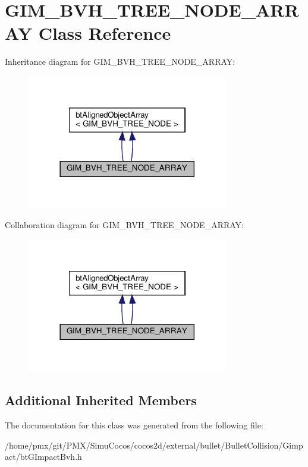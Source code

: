 \hypertarget{classGIM__BVH__TREE__NODE__ARRAY}{}\section{G\+I\+M\+\_\+\+B\+V\+H\+\_\+\+T\+R\+E\+E\+\_\+\+N\+O\+D\+E\+\_\+\+A\+R\+R\+AY Class Reference}
\label{classGIM__BVH__TREE__NODE__ARRAY}


Inheritance diagram for G\+I\+M\+\_\+\+B\+V\+H\+\_\+\+T\+R\+E\+E\+\_\+\+N\+O\+D\+E\+\_\+\+A\+R\+R\+AY\+:
\nopagebreak
\begin{figure}[H]
\begin{center}
\leavevmode
\includegraphics[width=249pt]{classGIM__BVH__TREE__NODE__ARRAY__inherit__graph}
\end{center}
\end{figure}


Collaboration diagram for G\+I\+M\+\_\+\+B\+V\+H\+\_\+\+T\+R\+E\+E\+\_\+\+N\+O\+D\+E\+\_\+\+A\+R\+R\+AY\+:
\nopagebreak
\begin{figure}[H]
\begin{center}
\leavevmode
\includegraphics[width=249pt]{classGIM__BVH__TREE__NODE__ARRAY__coll__graph}
\end{center}
\end{figure}
\subsection*{Additional Inherited Members}


The documentation for this class was generated from the following file\+:\begin{DoxyCompactItemize}
\item 
/home/pmx/git/\+P\+M\+X/\+Simu\+Cocos/cocos2d/external/bullet/\+Bullet\+Collision/\+Gimpact/bt\+G\+Impact\+Bvh.\+h\end{DoxyCompactItemize}
